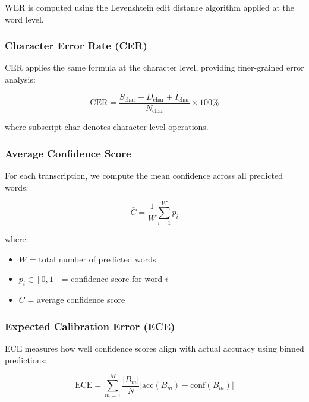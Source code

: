 \noindent WER is computed using the Levenshtein edit distance algorithm applied at the word level.

\subsubsection{Character Error Rate (CER)}

CER applies the same formula at the character level, providing finer-grained error analysis:

\begin{equation}
\boxed{
\text{CER} = \frac{S_{\text{char}} + D_{\text{char}} + I_{\text{char}}}{N_{\text{char}}} \times 100\%
}
\label{eq:cer}
\end{equation}

\noindent where subscript $\text{char}$ denotes character-level operations.

\subsubsection{Average Confidence Score}

For each transcription, we compute the mean confidence across all predicted words:

\begin{equation}
\boxed{
\bar{C} = \frac{1}{W} \sum_{i=1}^{W} p_i
}
\label{eq:avg_confidence}
\end{equation}

\noindent where:
\begin{itemize}
    \item $W$ = total number of predicted words
    \item $p_i \in [0, 1]$ = confidence score for word $i$
    \item $\bar{C}$ = average confidence score
\end{itemize}

\subsubsection{Expected Calibration Error (ECE)}

ECE measures how well confidence scores align with actual accuracy using binned predictions:

\begin{equation}
\boxed{
\text{ECE} = \sum_{m=1}^{M} \frac{|B_m|}{N} \left| \text{acc}(B_m) - \text{conf}(B_m) \right|
}
\label{eq:ece}
\end{equation}

